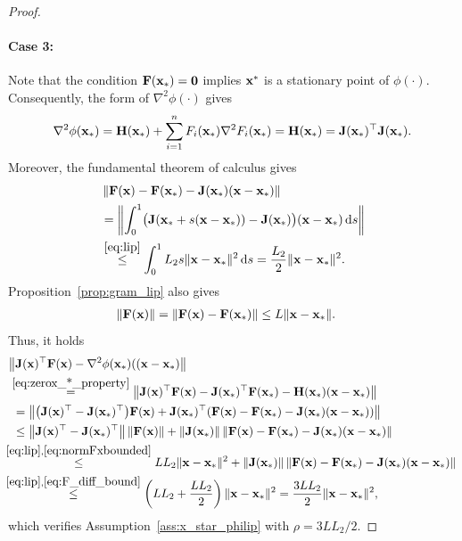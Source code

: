 \documentclass[11pt]{article}
\theoremstyle{plain}
\theoremstyle{definition}
\theoremstyle{remark}
\theoremstyle{plain}
\newcommand{\Norm}[1]{\left\| #1 \right\|}
\def\vx{{\bf{x}}}
\def\vx {{{\bf x}}}
\def\F{{\bf F}}
\def\H{{\bf H}}
\def \J{{\bf J}}
\def\x{{\bf x}}
\def\0{{\bf 0}}
\begin{document}
\begin{proof}
\paragraph{Case 3:} 
Note that the condition $\F(\x_*)=\0$ implies $\vx^*$ is a stationary point of $\phi(\cdot)$. 
Consequently, the form of
$\nabla^2\phi(\cdot)$ gives
\begin{align}
    \label{eq:zerox_*_property}
\nabla^2\phi(\x_*)=\H(\x_*)+\sum_{i=1}^nF_i(\x_*)\nabla^2F_i(\x_*)=\H(\x_*)=\J(\x_*)^{\top}\J(\x_*).
\end{align}
Moreover, the fundamental theorem of calculus gives
\begin{align}
    \label{eq:F_diff_bound}
    \begin{split}
&\Norm{\F(\x)-\F(\x_*)-\J(\x_*)(\x-\x_*)}\\
&=\Norm{\int_0^1
\bigl(\J(\x_*+s(\x-\x_*))-\J(\x_*)\bigr)
(\x-\x_*)\,{\rm d}s}\\
&\overset{\eqref{eq:lip}}{\leq}
\int_0^1L_2s\|\x-\x_*\|^2\,{\rm d}s
=\frac{L_2}{2}\|\x-\x_*\|^2.
    \end{split}
\end{align}
Proposition~\ref{prop:gram_lip} also gives
\begin{align}
    \label{eq:normFxbounded}
\|\F(\x)\|
&=\|\F(\x)-\F(\x_*)\|
\leq L\|\x-\x_*\|.
\end{align}
Thus, it holds
\begin{align*}
&\big\|\J(\x)^{\top}\F(\x)-\nabla^2\phi(\x_*)((\x-\x_*)\big\|\\
&\overset{\eqref{eq:zerox_*_property}}{=}\big\|\J(\x)^{\top}\F(\x)-\J(\x_*)^{\top}\F(\x_*)
-\H(\x_*)(\x-\x_*)\big\|\\
&~=\big\|\big(\J(\x)^{\top}-\J(\x_*)^{\top}\big)\F(\x)
+\J(\x_*)^{\top}
(\F(\x)-\F(\x_*)-\J(\x_*)(\x-\x_*))\big\|\\
&~\leq\big\|\J(\x)^{\top}-\J(\x_*)^{\top}\big\|\,\|\F(\x)\|
+\|\J(\x_*)\|\,
\|\F(\x)-\F(\x_*)-\J(\x_*)(\x-\x_*)\|\\
&\!\!\!\overset{\eqref{eq:lip},\eqref{eq:normFxbounded}}{\leq} LL_2\|\x-\x_*\|^2+ \|\J(\x_*)\|\,
\|\F(\x)-\F(\x_*)-\J(\x_*)(\x-\x_*)\|\\
&\!\!\!\overset{\eqref{eq:lip},\eqref{eq:F_diff_bound}}{\leq}
\left(LL_2+\frac{LL_2}{2}\right)\|\x-\x_*\|^2
=\frac{3LL_2}{2}\|\x-\x_*\|^2,
\end{align*}
which verifies Assumption~\ref{ass:x_star_philip} with $\rho = {3LL_2}/{2}$.
\end{proof}
\end{document}
